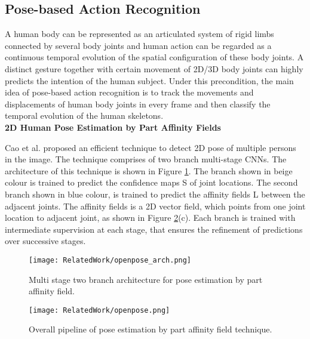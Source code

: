 \subsection{Pose-based Action Recognition}
\label{subsec:pose_based_ar}
A human body can be represented as an articulated system of rigid limbs connected by several body joints and human action can be regarded as a continuous temporal evolution of the spatial configuration of these body joints. A distinct gesture together with certain movement of 2D/3D body joints can highly predicts the intention of the human subject. Under this precondition, the main idea of pose-based action recognition is to track the movements and displacements of human body joints in every frame and then classify the temporal evolution of the human skeletons. \\

\textbf{2D Human Pose Estimation by Part Affinity Fields}

Cao et al. \cite{cao2017realtime} proposed an efficient technique to detect 2D pose of multiple
persons in the image. The technique comprises of two branch multi-stage CNNs. The architecture of this technique is shown in Figure \ref{fig:openpose_arch}. The branch shown in beige colour is trained to predict the confidence maps S of joint locations. The second branch shown in blue colour, is trained to predict the affinity fields L between the adjacent joints. The affinity fields is a 2D vector field, which points from one joint location to adjacent joint, as shown in Figure \ref{fig:openpose}(c). Each branch is trained with intermediate supervision at each stage, that ensures the refinement of predictions over successive stages. 

\begin{figure}[H]
  \centering
  \texttt{[image: RelatedWork/openpose\_arch.png]}
  \caption{Multi stage two branch architecture for pose estimation by part affinity field. 
           \cite{cao2017realtime}}
  \label{fig:openpose_arch}
\end{figure} 

\begin{figure}[h!]
  \centering
  \texttt{[image: RelatedWork/openpose.png]}
  \caption{Overall pipeline of pose estimation by part affinity field technique. 
           \cite{cao2017realtime}}
  \label{fig:openpose}
\end{figure} 

